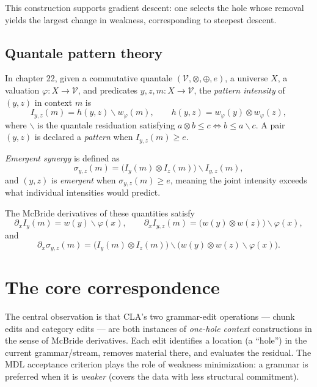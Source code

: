 \documentclass[11pt]{article}
\begin{document}
This construction supports gradient descent: one selects the hole whose removal yields the largest change in weakness, corresponding to steepest descent.

\subsection{Quantale pattern theory}

In chapter 22, given a commutative quantale $(\mathcal{V}, \otimes, \oplus, e)$, a universe $X$, a valuation $\varphi : X \to \mathcal{V}$, and predicates $y, z, m : X \to \mathcal{V}$, the \emph{pattern intensity} of $(y, z)$ in context $m$ is
\[
  I_{y,z}(m) = h(y,z) \backslash w_\varphi(m), \qquad h(y,z) = w_\varphi(y) \otimes w_\varphi(z),
\]
where $\backslash$ is the quantale residuation satisfying $a \otimes b \leq c \iff b \leq a \backslash c$.  A pair $(y, z)$ is declared a \emph{pattern} when $I_{y,z}(m) \geq e$.

\emph{Emergent synergy} is defined as
\[
  \sigma_{y,z}(m) = \bigl(I_y(m) \otimes I_z(m)\bigr) \backslash I_{y,z}(m),
\]
and $(y, z)$ is \emph{emergent} when $\sigma_{y,z}(m) \geq e$, meaning the joint intensity exceeds what individual intensities would predict.

The McBride derivatives of these quantities satisfy
\[
  \partial_x I_y(m) = w(y) \backslash \varphi(x), \qquad \partial_x I_{y,z}(m) = \bigl(w(y) \otimes w(z)\bigr) \backslash \varphi(x),
\]
and
\[
  \partial_x \sigma_{y,z}(m) = \bigl(I_y(m) \otimes I_z(m)\bigr) \backslash \bigl(w(y) \otimes w(z) \backslash \varphi(x)\bigr).
\]

\section{The core correspondence}

The central observation is that CLA's two grammar-edit operations --- chunk edits and category edits --- are both instances of \emph{one-hole context} constructions in the sense of McBride derivatives.  Each edit identifies a location (a ``hole'') in the current grammar/stream, removes material there, and evaluates the residual.  The MDL acceptance criterion plays the role of weakness minimization: a grammar is preferred when it is \emph{weaker} (covers the data with less structural commitment).
\end{document}
